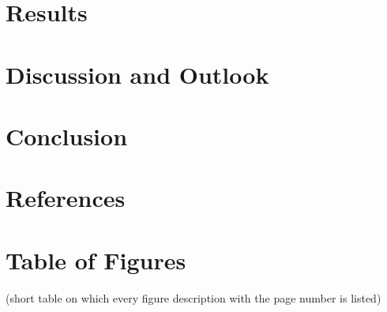 \documentclass{article}
\begin{document}
	\section{Results}
	\section{Discussion and Outlook}
	\section{Conclusion}
	
	\section{References}
	\printbibliography[
	heading=bibintoc,
	title={Bibliography}
	]	
	\section{Table of Figures}
	(short table on which every figure description with the page number is listed)
\end{document}
